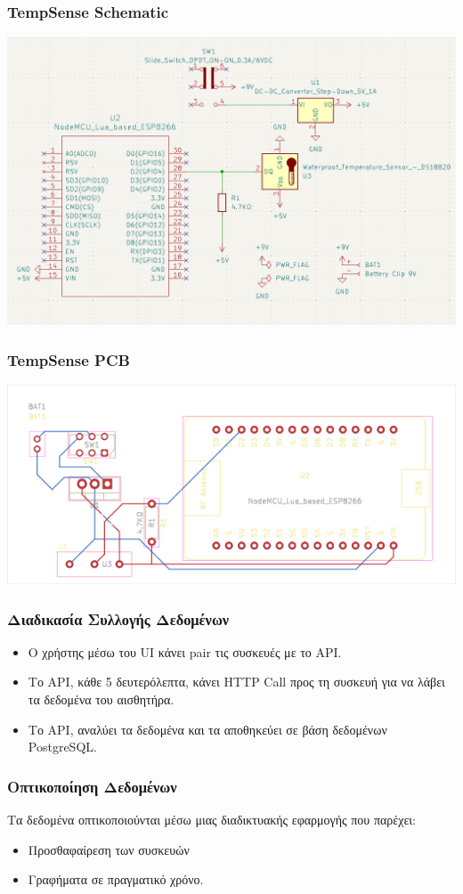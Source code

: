 \documentclass{beamer}
\begin{document}
\begin{frame}
\frametitle{TempSense Schematic}
	\centerline{\includegraphics[height=0.6\textwidth]{assets/tempsense-schematic}}
\end{frame}
\begin{frame}
\frametitle{TempSense PCB}
	\colorbox{PineGreen}{\centerline{\includegraphics[height=0.4\textwidth]{assets/TempSense-brd}}}
\end{frame}

\begin{frame}
\frametitle{Διαδικασία Συλλογής Δεδομένων}
\begin{itemize}
    \item Ο χρήστης μέσω του UI κάνει pair τις συσκευές με το API.
    \item Το API, κάθε 5 δευτερόλεπτα, κάνει HTTP Call προς τη συσκευή για να λάβει τα δεδομένα του αισθητήρα.
    \item Το API, αναλύει τα δεδομένα και τα αποθηκεύει σε βάση δεδομένων PostgreSQL.
\end{itemize}
\end{frame}

\begin{frame}
\frametitle{Οπτικοποίηση Δεδομένων}
Τα δεδομένα οπτικοποιούνται μέσω μιας διαδικτυακής εφαρμογής που παρέχει:
\begin{itemize}
    \item Προσθαφαίρεση των συσκευών
    \item Γραφήματα σε πραγματικό χρόνο.
\end{itemize}
\end{frame}
\end{document}
